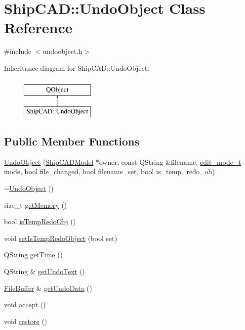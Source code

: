 \hypertarget{classShipCAD_1_1UndoObject}{\section{Ship\-C\-A\-D\-:\-:Undo\-Object Class Reference}
\label{classShipCAD_1_1UndoObject}
}


{\ttfamily \#include $<$undoobject.\-h$>$}

Inheritance diagram for Ship\-C\-A\-D\-:\-:Undo\-Object\-:\begin{figure}[H]
\begin{center}
\leavevmode
\includegraphics[height=2.000000cm]{classShipCAD_1_1UndoObject}
\end{center}
\end{figure}
\subsection*{Public Member Functions}
\begin{DoxyCompactItemize}
\item 
\hyperlink{classShipCAD_1_1UndoObject_a7822f20d55e4647ad4e4508b3e3f229b}{Undo\-Object} (\hyperlink{classShipCAD_1_1ShipCADModel}{Ship\-C\-A\-D\-Model} $\ast$owner, const Q\-String \&filename, \hyperlink{namespaceShipCAD_a66144e3f3a53da01f51c9bdb94fcae31}{edit\-\_\-mode\-\_\-t} mode, bool file\-\_\-changed, bool filename\-\_\-set, bool is\-\_\-temp\-\_\-redo\-\_\-ob)
\item 
\hyperlink{classShipCAD_1_1UndoObject_abfeebd1cd99df71bea798fafe15c474f}{$\sim$\-Undo\-Object} ()
\item 
size\-\_\-t \hyperlink{classShipCAD_1_1UndoObject_a74cc90d84599a153a37e13ab35018ff6}{get\-Memory} ()
\item 
bool \hyperlink{classShipCAD_1_1UndoObject_a9f949591bc4031ed4af67ce493e42d2e}{is\-Temp\-Redo\-Obj} ()
\item 
void \hyperlink{classShipCAD_1_1UndoObject_aecb1ca66c7c37fa2e1ef4ef2894bc9a4}{set\-Is\-Temp\-Redo\-Object} (bool set)
\item 
Q\-String \hyperlink{classShipCAD_1_1UndoObject_a6d71ab49eb2b14834a0263a4292fb851}{get\-Time} ()
\item 
Q\-String \& \hyperlink{classShipCAD_1_1UndoObject_abc895eabc12ece513bd763551f505a2e}{get\-Undo\-Text} ()
\item 
\hyperlink{classShipCAD_1_1FileBuffer}{File\-Buffer} \& \hyperlink{classShipCAD_1_1UndoObject_a160e77df4c6ae2bdefc5257aa8e6d85b}{get\-Undo\-Data} ()
\item 
void \hyperlink{classShipCAD_1_1UndoObject_a93bad349f284a0ff1cece56aa931f9e3}{accept} ()
\item 
void \hyperlink{classShipCAD_1_1UndoObject_a9cace556c2092492f681654d72e35ba6}{restore} ()
\end{DoxyCompactItemize}


